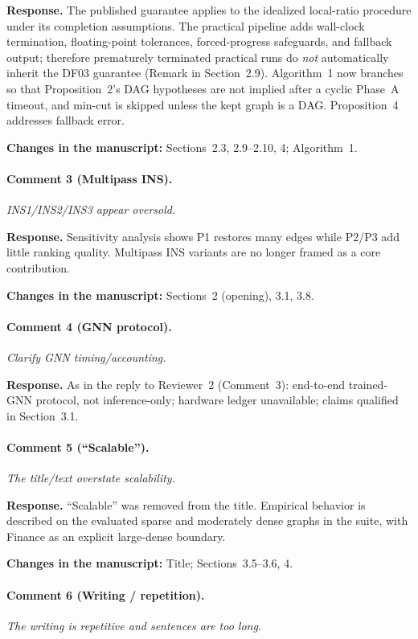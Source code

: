 \documentclass[11pt]{article}
\newcommand{\commentbox}[1]{\par\textit{#1}\par\medskip}
\newcommand{\changes}[1]{\textbf{Changes in the manuscript:} #1\par\medskip}
\begin{document}
\noindent\textbf{Response.}
The published guarantee applies to the idealized local-ratio procedure under its completion assumptions. The practical pipeline adds wall-clock termination, floating-point tolerances, forced-progress safeguards, and fallback output; therefore prematurely terminated practical runs do \emph{not} automatically inherit the DF03 guarantee (Remark in Section~2.9). Algorithm~1 now branches so that Proposition~2's DAG hypotheses are not implied after a cyclic Phase~A timeout, and min-cut is skipped unless the kept graph is a DAG. Proposition~4 addresses fallback error.

\changes{Sections~2.3, 2.9--2.10, 4; Algorithm~1.}

\paragraph{Comment 3 (Multipass INS).}
\commentbox{INS1/INS2/INS3 appear oversold.}

\noindent\textbf{Response.}
Sensitivity analysis shows P1 restores many edges while P2/P3 add little ranking quality. Multipass INS variants are no longer framed as a core contribution.

\changes{Sections~2 (opening), 3.1, 3.8.}

\paragraph{Comment 4 (GNN protocol).}
\commentbox{Clarify GNN timing/accounting.}

\noindent\textbf{Response.}
As in the reply to Reviewer~2 (Comment~3): end-to-end trained-GNN protocol, not inference-only; hardware ledger unavailable; claims qualified in Section~3.1.

\paragraph{Comment 5 (``Scalable'').}
\commentbox{The title/text overstate scalability.}

\noindent\textbf{Response.}
``Scalable'' was removed from the title. Empirical behavior is described on the evaluated sparse and moderately dense graphs in the suite, with Finance as an explicit large-dense boundary.

\changes{Title; Sections~3.5--3.6, 4.}

\paragraph{Comment 6 (Writing / repetition).}
\commentbox{The writing is repetitive and sentences are too long.}
\end{document}
